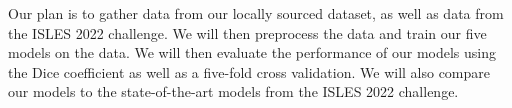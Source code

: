 Our plan is to gather data from our locally sourced dataset, as well as
data from the ISLES 2022 challenge. We will then preprocess the data
and train our five models on the data. We will then evaluate the
performance of our models using the Dice coefficient as well as a
five-fold cross validation. We will also compare our models to the
state-of-the-art models from the ISLES 2022 challenge. 